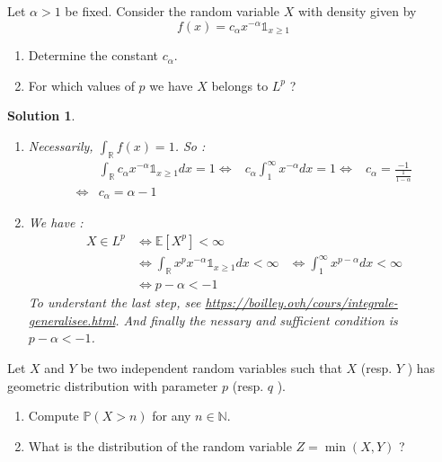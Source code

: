 \documentclass{article}
\newcommand{\esperance}[1]{\mathbb{E}[#1]}
\newcommand{\R}{\mathbb{R}}
\newtheorem{solution}{Solution}
\begin{document}
\begin{Exercise} Let $\alpha>1$ be fixed. Consider the random variable $X$ with density given by
  $$
    f(x)=c_{\alpha} x^{-\alpha} \mathbb{1}_{x \geq 1}
  $$
  \begin{enumerate}
    \item Determine the constant $c_{\alpha}$.

    \item For which values of $p$ we have $X$ belongs to $L^{p}$ ?

  \end{enumerate}
\end{Exercise}

\begin{solution}
  \begin{enumerate}
    \item Necessarily, $\int_\R f(x) = 1$. So :
          \begin{align*}
                 & \int_\R c_{\alpha} x^{-\alpha} \mathbb{1}_{x \geq 1} dx = 1
            \iff & c_{\alpha} \int_1^\infty x^{-\alpha} dx = 1
            \iff & c_{\alpha} = \frac{-1}{\frac{1}{1-\alpha}}                  \\
            \iff & c_{\alpha} = \alpha -1
          \end{align*}
    \item We have :
          \begin{align*}
            X \in L^p & \iff \esperance{X^p} < \infty                                  \\
                      & \iff \int_\R x^p x^{-\alpha} \mathbb{1}_{x \geq 1} dx < \infty
                      & \iff \int_1^\infty x^{p-\alpha} dx < \infty                    \\
                      & \iff p - \alpha < -1
          \end{align*}
          To understant the last step, see \url{https://boilley.ovh/cours/integrale-generalisee.html}.
          And finally the nessary and sufficient condition is $p - \alpha < -1$.
  \end{enumerate}
\end{solution}

\begin{Exercise} Let $X$ and $Y$ be two independent random variables such that $X$ (resp. $Y$ ) has geometric distribution with parameter $p$ (resp. $q$ ).
  \begin{enumerate}
    \item Compute $\mathbb{P}(X>n)$ for any $n \in \mathbb{N}$.
    \item What is the distribution of the random variable $Z=\min (X, Y)$ ?
  \end{enumerate}
\end{Exercise}
\end{document}
